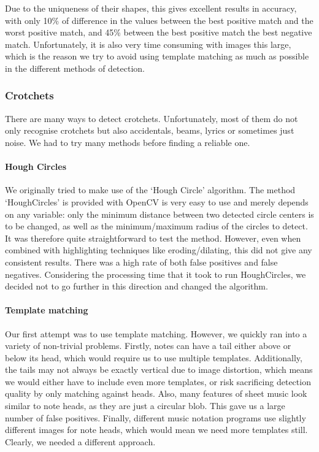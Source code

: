 Due to the uniqueness of their shapes, this gives excellent results in accuracy, with only 10\% of difference in the values between the best positive match and the worst positive match, and 45\% between the best positive match the best negative match. Unfortunately, it is also very time consuming with images this large, which is the reason we try to avoid using template matching as much as possible in the different
methods of detection.

\subsubsection{Crotchets}

There are many ways to detect crotchets. Unfortunately, most of them do not only recognise crotchets but also accidentals, beams, lyrics or sometimes just noise. We had to try many methods before finding a reliable one.

\paragraph{Hough Circles}

We originally tried to make use of the ‘Hough Circle’ algorithm. The method ‘HoughCircles’ is provided with OpenCV is very easy to use and merely depends on any variable: only the minimum distance between two detected circle centers is to be changed, as well as the minimum/maximum radius of the circles to detect. It was therefore quite straightforward to test the method. However, even when combined
with highlighting techniques like eroding/dilating, this did not give any consistent results. There was a high rate of both false positives and false negatives. Considering the processing time that it took to run HoughCircles, we decided not to go further in this direction and changed the algorithm.

\paragraph{Template matching}

Our first attempt was to use template matching. However, we quickly ran into a variety of non-trivial problems. Firstly, notes can have a tail either above or below its head, which would require us to use multiple templates. Additionally, the tails may not always be exactly vertical due to image distortion, which means we would either have to include even more templates, or risk sacrificing
detection quality by only matching against heads. Also, many features of sheet music look similar to note heads, as they are just a circular blob. This gave us a large number of false positives. Finally, different music notation programs use slightly different images for note heads, which would mean we need more templates still. Clearly, we needed a different approach.

